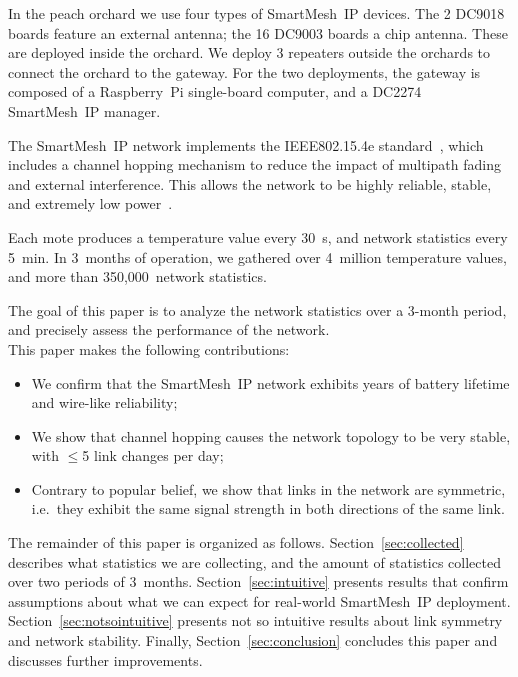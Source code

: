 \documentclass{elsarticle}
\newcommand{\smip}                {SmartMesh~IP\xspace}
\begin{document}

In the peach orchard we use four types of \smip devices.
The 2 DC9018 boards feature an external antenna; the 16 DC9003 boards a chip antenna.
These are deployed inside the orchard.
We deploy 3 repeaters outside the orchards to connect the orchard to the gateway.
For the two deployments, the gateway is composed of a Raspberry~Pi single-board computer, and a DC2274 \smip manager.


The \smip network implements the IEEE802.15.4e standard~\cite{std_ieee802154e_2012}, which includes a channel hopping mechanism to reduce the impact of multipath fading and external interference.
This allows the network to be highly reliable, stable, and extremely low power~\cite{watteyne10mitigating, watteyne09reliability}.


Each mote produces a temperature value every 30~s, and network statistics every 5~min.
In 3~months of operation, we gathered over 4~million temperature values, and more than 350,000~network statistics.


The goal of this paper is to analyze the network statistics over a 3-month period, and precisely assess the performance of the network.
\\

This paper makes the following contributions:
\begin{itemize}
    \item We confirm that the \smip network exhibits years of battery lifetime and wire-like reliability;
    \item We show that channel hopping causes the network topology to be very stable, with $\leq$5 link changes per day;
    \item Contrary to popular belief, we show that links in the network are symmetric, i.e.~they exhibit the same signal strength in both directions of the same link.
\end{itemize}


The remainder of this paper is organized as follows.
Section~\ref{sec:collected} describes what statistics we are collecting, and the amount of statistics collected over two periods of 3~months.
Section~\ref{sec:intuitive} presents results that confirm assumptions about what we can expect for real-world \smip deployment.
Section~\ref{sec:notsointuitive} presents not so intuitive results about link symmetry and network stability.
Finally, Section~\ref{sec:conclusion} concludes this paper and discusses further improvements.
\end{document}
